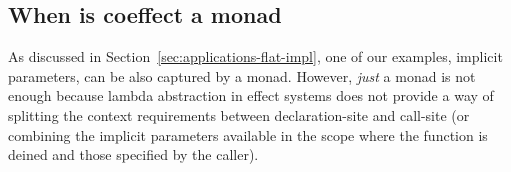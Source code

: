 
\subsection{When is coeffect a monad}
\label{sec:flat-related-monads}

As discussed in Section~\ref{sec:applications-flat-impl}, one of our examples, implicit 
parameters, can be also captured by a monad. However, \emph{just} a monad is not enough
because lambda abstraction in effect systems does not provide a way of splitting the context
requirements between declaration-site and call-site (or combining the implicit parameters
available in the scope where the function is deined and those specified by the caller).

